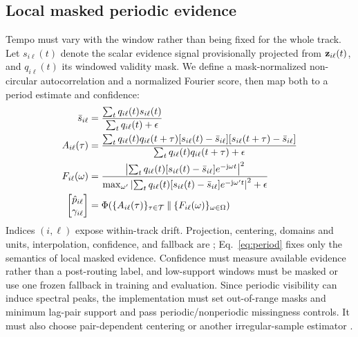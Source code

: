 \subsection{Local masked periodic evidence}
Tempo must vary with the window rather than being fixed for the whole track.
Let $s_{i\ell}(t)$ denote the scalar evidence signal provisionally projected
from \(\mathbf{z}_{i\ell}(t)\), and $q_{i\ell}(t)$ its windowed validity mask. We
define a mask-normalized non-circular autocorrelation and a normalized Fourier
score, then map both to a period estimate and confidence:
\begin{equation}
\begin{aligned}
 \bar s_{i\ell} &=
 \frac{\sum_t q_{i\ell}(t)s_{i\ell}(t)}
      {\sum_t q_{i\ell}(t)+\epsilon} \\
 A_{i\ell}(\tau) &=
 \frac{\sum_t q_{i\ell}(t)q_{i\ell}(t+\tau)
 [s_{i\ell}(t)-\bar s_{i\ell}]
 [s_{i\ell}(t+\tau)-\bar s_{i\ell}]}
 {\sum_t q_{i\ell}(t)q_{i\ell}(t+\tau)+\epsilon} \\
 F_{i\ell}(\omega) &=
 \frac{\left|\sum_t q_{i\ell}(t)[s_{i\ell}(t)-\bar s_{i\ell}]
 e^{-\mathrm{j}\omega t}\right|^2}
 {\max_{\omega'}\left|\sum_t q_{i\ell}(t)[s_{i\ell}(t)-\bar s_{i\ell}]
 e^{-\mathrm{j}\omega' t}\right|^2+\epsilon} \\
 \begin{bmatrix}\hat p_{i\ell}\\\gamma_{i\ell}\end{bmatrix} &=
 \Phi\!\left(\{A_{i\ell}(\tau)\}_{\tau\in\mathcal{T}}\mathbin\Vert
              \{F_{i\ell}(\omega)\}_{\omega\in\Omega}\right)
\end{aligned}
\label{eq:period}
\end{equation}
\noindent Indices $(i,\ell)$ expose within-track drift. Projection, centering,
domains and units, interpolation, confidence, and fallback are
; Eq.~\ref{eq:period} fixes only the semantics of
local masked evidence. Confidence must measure available evidence rather than a
post-routing label, and low-support windows must be masked or use one frozen
fallback in training and evaluation. Since periodic visibility can induce
spectral peaks, the implementation must set out-of-range masks and minimum
lag-pair support and pass periodic/nonperiodic missingness controls. It must also
choose pair-dependent centering or another irregular-sample estimator
\cite{lomb1976unequal}.

